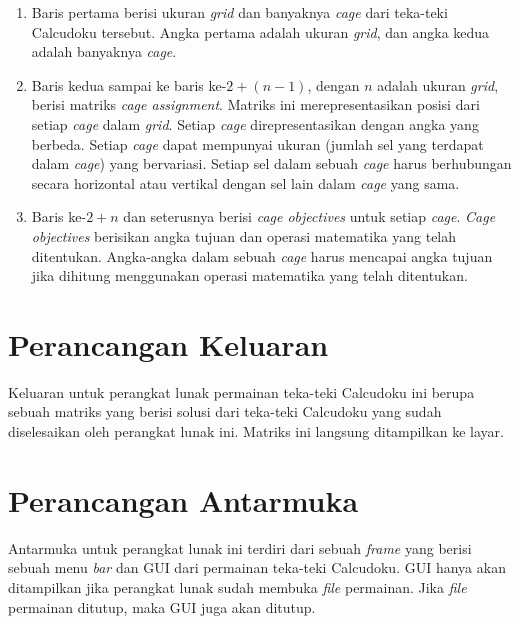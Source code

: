 \begin{enumerate}
\item Baris pertama berisi ukuran \textit{grid} dan banyaknya \textit{cage} dari teka-teki Calcudoku tersebut. Angka pertama adalah ukuran \textit{grid}, dan angka kedua adalah banyaknya \textit{cage}.
\item Baris kedua sampai ke baris ke-\begin{math}2 + (n - 1)\end{math}, dengan \begin{math}n\end{math} adalah ukuran \textit{grid}, berisi matriks \textit{cage assignment}. Matriks ini merepresentasikan posisi dari setiap \textit{cage} dalam \textit{grid}. Setiap \textit{cage} direpresentasikan dengan angka yang berbeda. Setiap \textit{cage} dapat mempunyai ukuran (jumlah sel yang terdapat dalam \textit{cage}) yang bervariasi. Setiap sel dalam sebuah \textit{cage} harus berhubungan secara horizontal atau vertikal dengan sel lain dalam \textit{cage} yang sama.
\item Baris ke-\begin{math}2 + n\end{math} dan seterusnya berisi \textit{cage objectives} untuk setiap \textit{cage}. \textit{Cage objectives} berisikan angka tujuan dan operasi matematika yang telah ditentukan. Angka-angka dalam sebuah \textit{cage} harus mencapai angka tujuan jika dihitung menggunakan operasi matematika yang telah ditentukan.
\end{enumerate}

\section{Perancangan Keluaran}
\label{sec:perancangankeluaran}

Keluaran untuk perangkat lunak permainan teka-teki Calcudoku ini berupa sebuah matriks yang berisi solusi dari teka-teki Calcudoku yang sudah diselesaikan oleh perangkat lunak ini. Matriks ini langsung ditampilkan ke layar.

\section{Perancangan Antarmuka}
\label{sec:perancanganantarmuka}

Antarmuka untuk perangkat lunak ini terdiri dari sebuah \textit{frame} yang berisi sebuah menu \textit{bar} dan GUI dari permainan teka-teki Calcudoku. GUI hanya akan ditampilkan jika perangkat lunak sudah membuka \textit{file} permainan. Jika \textit{file} permainan ditutup, maka GUI juga akan ditutup.


